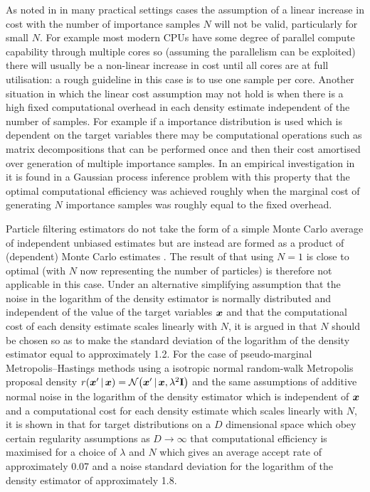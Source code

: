 As noted in \citep{sherlock2016pseudo} in many practical settings cases the assumption of a linear increase in cost with the number of importance samples $N$ will not be valid, particularly for small $N$. For example most modern \acp{CPU} have some degree of parallel compute capability through multiple cores so (assuming the parallelism can be exploited) there will usually be a non-linear increase in cost until all cores are at full utilisation: a rough guideline in this case is to use one sample per core. Another situation in which the linear cost assumption may not hold is when there is a high fixed computational overhead in each density estimate independent of the number of samples. For example if a importance distribution is used which is dependent on the target variables there may be computational operations such as matrix decompositions that can be performed once and then their cost amortised over generation of multiple importance samples. In an empirical investigation in \citep{sherlock2015efficiency} it is found in a Gaussian process inference problem with this property that the optimal computational efficiency was achieved roughly when the marginal cost of generating $N$ importance samples was roughly equal to the fixed overhead.

Particle filtering estimators do not take the form of a simple Monte Carlo average of independent unbiased estimates but are instead are formed as a product of (dependent) Monte Carlo estimates \citep{sherlock2016pseudo}. The result of \citep{sherlock2016pseudo} that using $N=1$ is close to optimal (with $N$ now representing the number of particles) is therefore not applicable in this case. Under an alternative simplifying assumption that the noise in the logarithm of the density estimator is normally distributed and independent of the value of the target variables $\boldsymbol{x}$ and that the computational cost of each density estimate scales linearly with $N$, it is argued in \citep{doucet2015efficient} that $N$ should be chosen so as to make the standard deviation of the logarithm of the density estimator equal to approximately 1.2. For the case of pseudo-marginal Metropolis--Hastings methods using a isotropic normal random-walk Metropolis proposal density $r(\vct{x}'\gvn\vct{x}) = \nrm{\vct{x}'\gvn\vct{x},\lambda^2\mathbf{I}}$ and the same assumptions of additive normal noise in the logarithm of the density estimator which is independent of $\boldsymbol{x}$ and a computational cost for each density estimate which scales linearly with $N$, it is shown in \citep{sherlock2015efficiency} that for target distributions on a $D$ dimensional space which obey certain regularity assumptions as $D \to \infty$ that computational efficiency is maximised for a choice of $\lambda$ and $N$ which gives an average accept rate of approximately 0.07 and a noise standard deviation for the logarithm of the density estimator of approximately 1.8.

